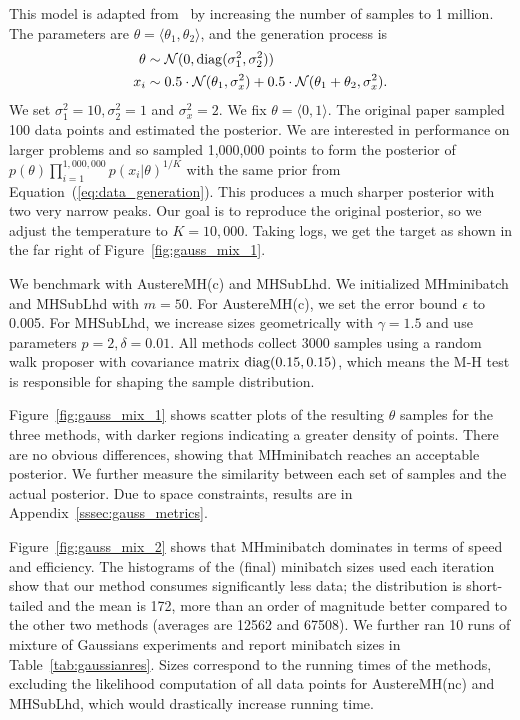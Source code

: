 \documentclass[letterpaper]{article}
\begin{document}
This model is adapted from~\citep{langevin_2011} by increasing the number of
samples to 1 million.  The parameters are $\theta = \langle \theta_1,\theta_2
\rangle$, and the generation process is
\begin{equation}\label{eq:data_generation}
\begin{split}
    \theta &\sim \mathcal{N}(0, {\rm diag}(\sigma_1^2,\sigma_2^2)) \\
    x_i & \sim 0.5 \cdot \mathcal{N}(\theta_1, \sigma_x^2) + 0.5 \cdot \mathcal{N}(\theta_1+\theta_2, \sigma_x^2).
\end{split}
\end{equation}
We set $\sigma_1^2 = 10, \sigma_2^2 = 1$ and $\sigma_x^2=2$.  We fix $\theta =
\langle 0,1 \rangle$. The original paper sampled 100 data points and estimated
the posterior. We are interested in performance on larger problems and so
sampled 1,000,000 points to form the posterior of
$p(\theta)\prod_{i=1}^{1,000,000}p(x_i | \theta)^{1/K}$ with the same prior from
Equation~(\ref{eq:data_generation}). This produces a much sharper posterior with
two very narrow peaks.  Our goal is to reproduce the original posterior, so we
adjust the temperature to $K=10,000$.  Taking logs, we get the target as shown
in the far right of Figure~\ref{fig:gauss_mix_1}.

We benchmark with {\sc AustereMH(c)} and {\sc MHSubLhd}. We initialized {\sc
MHminibatch} and {\sc MHSubLhd} with $m=50$. For {\sc AustereMH(c)}, we set
the error bound $\epsilon$ to 0.005.  For {\sc MHSubLhd}, we increase
sizes geometrically with $\gamma = 1.5$ and use parameters $p = 2, \delta =
0.01$.  All methods collect 3000 samples using a random walk proposer with
covariance matrix ${\rm diag}(0.15, 0.15)$, which means the M-H test is
responsible for shaping the sample distribution.

Figure~\ref{fig:gauss_mix_1} shows scatter plots of the resulting $\theta$
samples for the three methods, with darker regions indicating a greater density
of points. There are no obvious differences, showing that {\sc MHminibatch}
reaches an acceptable posterior. We further measure the similarity between each
set of samples and the actual posterior. Due to space constraints, results are
in Appendix~\ref{sssec:gauss_metrics}.

Figure~\ref{fig:gauss_mix_2} shows that {\sc MHminibatch} dominates in terms of
speed and efficiency. The histograms of the (final) minibatch sizes used each
iteration show that our method consumes significantly less data; the
distribution is short-tailed and the mean is 172, more than an order of
magnitude better compared to the other two methods (averages are 12562 and
67508). We further ran 10 runs of mixture of Gaussians experiments and report
minibatch sizes in Table~\ref{tab:gaussianres}. Sizes correspond to the running
times of the methods, excluding the likelihood computation of all data points
for {\sc AustereMH(nc)} and {\sc MHSubLhd}, which would drastically increase
    running time.
\end{document}

